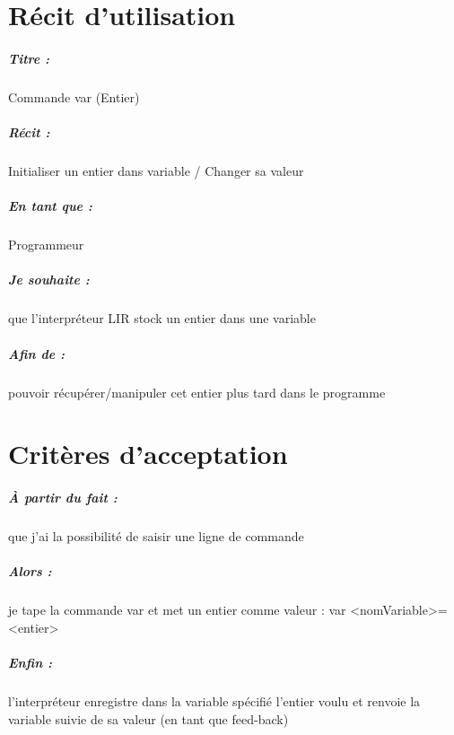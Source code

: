 \documentclass[12pt,a5paper, notitle, oneside]{report}
\begin{document}
    \chapter*{Récit d'utilisation}

    \paragraph{Titre : } Commande var (Entier)
    \paragraph{Récit : }  Initialiser un entier dans variable / Changer sa valeur
    \paragraph{En tant que : } Programmeur
    \paragraph{Je souhaite : } que l'interpréteur LIR stock un entier dans une variable
    \paragraph{Afin de : } pouvoir récupérer/manipuler cet entier plus tard dans le programme
    \newpage

    \chapter*{Critères d'acceptation}

    \paragraph{À partir du fait : } que j'ai la possibilité de saisir une ligne de commande
    \paragraph{Alors : } je tape la commande var et met un entier comme valeur : var <nomVariable>=<entier>
    \paragraph{Enfin : } l'interpréteur enregistre dans la variable spécifié l'entier voulu et renvoie la variable suivie de sa valeur (en tant que feed-back)
\end{document}

